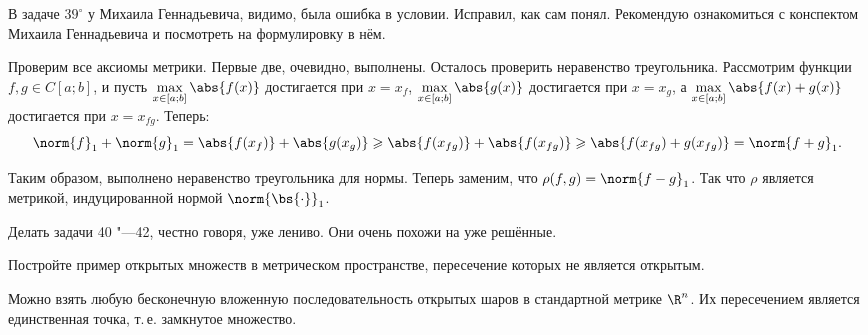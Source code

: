 \begin{remark}
    В задаче $39^\circ$ у Михаила Геннадьевича, видимо, была ошибка в условии. Исправил, как сам понял. Рекомендую ознакомиться с конспектом Михаила Геннадьевича и посмотреть на формулировку в нём.
\end{remark}

\begin{solution}
    Проверим все аксиомы метрики. Первые две, очевидно, выполнены. Осталось проверить неравенство треугольника. Рассмотрим функции $f, g \in C[a; b]$, и пусть $\max\limits_{x \in [a; b]}\abs{f(x)}$ достигается при $x = x_f$, $\max\limits_{x \in [a; b]}\abs{g(x)}$ достигается при $x = x_g$, а $\max\limits_{x \in [a; b]}\abs{f(x) + g(x)}$ достигается при $x = x_{fg}$. Теперь:
    \[
        \norm{f}_1 + \norm{g}_1 = \abs{f(x_f)} + \abs{g(x_g)} \geqslant \abs{f(x_{fg})} + \abs{f(x_{fg})} \geqslant \abs{f(x_{fg}) + g(x_{fg})} = \norm{f + g}_1.
    \]

    Таким образом, выполнено неравенство треугольника для нормы. Теперь заменим, что $\rho(f, g) = \norm{f - g}_1$. Так что $\rho$ является метрикой, индуцированной нормой $\norm{\bs{\cdot}}_1$.
\end{solution}

Делать задачи 40 "---42, честно говоря, уже лениво. Они очень похожи на уже решённые.

\begin{problem}[44$^\circ$]
    Постройте пример открытых множеств в метрическом пространстве, пересечение которых не является открытым.
\end{problem}

\begin{solution}
    Можно взять любую бесконечную вложенную последовательность открытых шаров в стандартной метрике $\R^n$. Их пересечением является единственная точка, т.\,е. замкнутое множество.
\end{solution}

